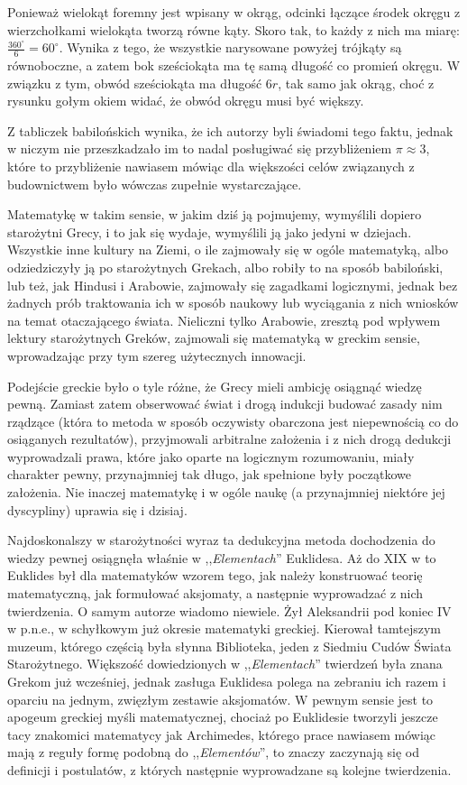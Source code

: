 \documentclass[12pt, a4paper]{scrartcl}
\begin{document}
Ponieważ wielokąt foremny jest wpisany w okrąg, odcinki łączące środek
okręgu z wierzchołkami wielokąta tworzą równe kąty. Skoro tak, to każdy z nich
ma miarę: $\frac{360^\circ}{6} = 60^\circ$. Wynika z tego, że wszystkie
narysowane powyżej trójkąty są równoboczne, a zatem bok sześciokąta ma tę samą
długość co promień okręgu. W związku z tym, obwód sześciokąta ma długość $6r$,
tak samo jak okrąg, choć z rysunku gołym okiem widać, że obwód okręgu musi być
większy.

Z tabliczek babilońskich wynika, że ich autorzy byli świadomi tego faktu, jednak
w niczym nie przeszkadzało im to nadal posługiwać się przybliżeniem $\pi
\approx 3$, które to przybliżenie nawiasem mówiąc dla większości celów
związanych z budownictwem było wówczas zupełnie wystarczające.

Matematykę w takim sensie, w jakim dziś ją pojmujemy, wymyślili dopiero
starożytni Grecy, i to jak się wydaje, wymyślili ją jako jedyni w dziejach.
Wszystkie inne kultury na Ziemi, o ile zajmowały się w ogóle matematyką, albo
odziedziczyły ją po starożytnych Grekach, albo robiły to na sposób babiloński,
lub też, jak Hindusi i Arabowie, zajmowały się zagadkami logicznymi, jednak bez
żadnych prób traktowania ich w sposób naukowy lub wyciągania z nich wniosków na
temat otaczającego świata. Nieliczni tylko Arabowie, zresztą pod wpływem lektury
starożytnych Greków, zajmowali się matematyką w greckim sensie, wprowadzając przy
tym szereg użytecznych innowacji.

Podejście greckie było o tyle różne, że Grecy mieli ambicję osiągnąć wiedzę
pewną. Zamiast zatem obserwować świat i drogą indukcji budować zasady
nim rządzące (która to metoda w sposób oczywisty obarczona jest niepewnością
co do osiąganych rezultatów), przyjmowali arbitralne założenia i z nich drogą
dedukcji wyprowadzali prawa, które jako oparte na logicznym rozumowaniu, miały
charakter pewny, przynajmniej tak długo, jak spełnione były początkowe
założenia. Nie inaczej matematykę i w ogóle naukę (a przynajmniej niektóre jej
dyscypliny) uprawia się i dzisiaj.

Najdoskonalszy w starożytności wyraz ta dedukcyjna metoda dochodzenia do wiedzy
pewnej osiągnęła właśnie w ,,\emph{Elementach}'' Euklidesa. Aż do XIX w to
Euklides był dla matematyków wzorem tego, jak należy konstruować teorię
matematyczną, jak formułować aksjomaty, a następnie wyprowadzać z nich
twierdzenia. O samym autorze wiadomo niewiele. Żył Aleksandrii pod koniec IV w
p.n.e., w schyłkowym już okresie matematyki greckiej. Kierował tamtejszym
muzeum, którego częścią była słynna Biblioteka, jeden z Siedmiu Cudów Świata
Starożytnego. Większość dowiedzionych w ,,\emph{Elementach}'' twierdzeń była
znana Grekom już wcześniej, jednak zasługa Euklidesa polega na zebraniu ich
razem i oparciu na jednym, zwięzłym zestawie aksjomatów. W pewnym sensie jest to
apogeum greckiej myśli matematycznej, chociaż po Euklidesie tworzyli jeszcze
tacy znakomici matematycy jak Archimedes, którego prace nawiasem mówiąc mają z
reguły formę podobną do ,,\emph{Elementów}'', to znaczy zaczynają się od
definicji i postulatów, z których następnie wyprowadzane są kolejne twierdzenia.
\end{document}
